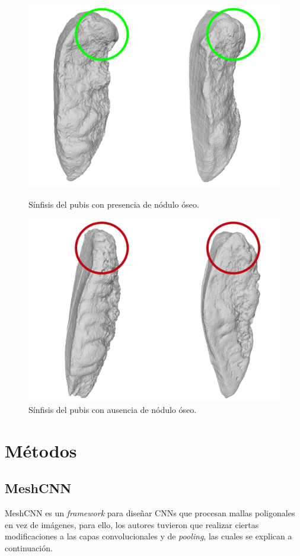 \begin{figure}[p]
    \centering
    \includegraphics[width=\linewidth]{imagenes/methods/boneNodule.png}
    \caption{Sínfisis del pubis con presencia de nódulo óseo.}
    \label{fig:exampleNodule}
    \includegraphics[width=\linewidth]{imagenes/methods/boneNoNodule.png}  
    \caption{Sínfisis del pubis con ausencia de nódulo óseo.}
    \label{fig:exampleNoNodule}
\end{figure}

\section{Métodos}
\subsection{MeshCNN}
MeshCNN \cite{hanocka2019meshcnn} es un \textit{framework} para diseñar CNNs que procesan mallas poligonales en vez de imágenes, para ello, los autores tuvieron que realizar ciertas modificaciones a las capas convolucionales y de \textit{pooling}, las cuales se explican a continuación. 

